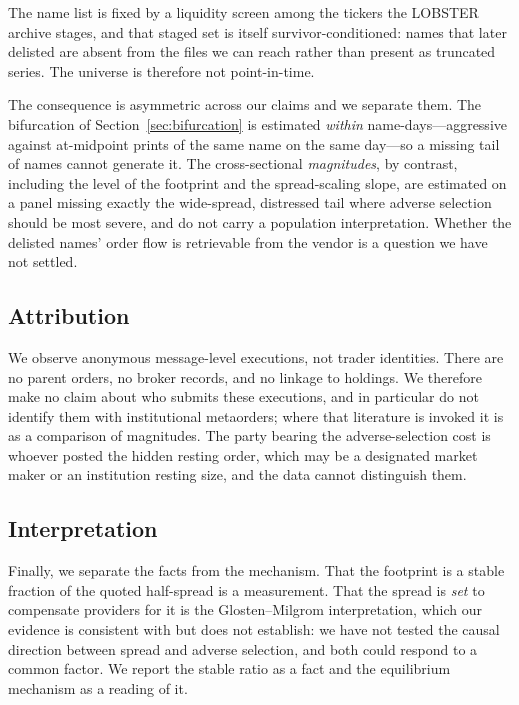 \documentclass[11pt]{article}
\begin{document}
The name list is fixed by a liquidity screen among the tickers the LOBSTER archive stages,
and that staged set is itself survivor-conditioned: names that later delisted are absent
from the files we can reach rather than present as truncated series. The universe is
therefore not point-in-time.

The consequence is asymmetric across our claims and we separate them. The bifurcation of
Section~\ref{sec:bifurcation} is estimated \emph{within} name-days---aggressive against
at-midpoint prints of the same name on the same day---so a missing tail of names cannot
generate it. The cross-sectional \emph{magnitudes}, by contrast, including the level of the
footprint and the spread-scaling slope, are estimated on a panel missing exactly the
wide-spread, distressed tail where adverse selection should be most severe, and do not carry
a population interpretation. Whether the delisted names' order flow is retrievable from the
vendor is a question we have not settled.

\subsection{Attribution}

We observe anonymous message-level executions, not trader identities. There are no parent
orders, no broker records, and no linkage to holdings. We therefore make no claim about who
submits these executions, and in particular do not identify them with institutional
metaorders; where that literature is invoked it is as a comparison of magnitudes. The party
bearing the adverse-selection cost is whoever posted the hidden resting order, which may be
a designated market maker or an institution resting size, and the data cannot distinguish
them.

\subsection{Interpretation}

Finally, we separate the facts from the mechanism. That the footprint is a stable fraction
of the quoted half-spread is a measurement. That the spread is \emph{set} to compensate
providers for it is the Glosten--Milgrom interpretation, which our evidence is consistent
with but does not establish: we have not tested the causal direction between spread and
adverse selection, and both could respond to a common factor. We report the stable ratio as
a fact and the equilibrium mechanism as a reading of it.
\end{document}
